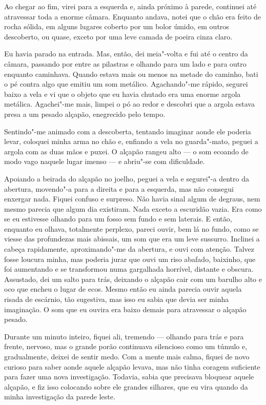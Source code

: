 Ao chegar ao fim, virei para a esquerda e, ainda próximo à parede, continuei até atravessar toda a enorme câmara.
Enquanto andava, notei que o chão era feito de rocha sólida, em alguns lugares coberto por um bolor úmido, em outros
descoberto, ou quase, exceto por uma leve camada de poeira cinza claro.

Eu havia parado na entrada. Mas, então, dei meia"-volta e fui até o centro da câmara, passando por entre as pilastras e
olhando para um lado e para outro enquanto caminhava. Quando estava mais ou menos na metade do caminho, bati o pé contra
algo que emitiu um som metálico. Agachando"-me rápido, segurei baixo a vela e vi que o objeto que eu havia chutado
era uma enorme argola metálica. Agachei"-me mais, limpei o pó ao redor e descobri que a argola estava presa a
um pesado alçapão, enegrecido pelo tempo.

Sentindo"-me animado com a descoberta, tentando imaginar aonde ele poderia levar, coloquei minha arma no chão e,
enfiando a vela no guarda"-mato, peguei a argola com as duas mãos e puxei. O alçapão rangeu alto --- o som ecoando de modo
vago naquele lugar imenso --- e abriu"-se com dificuldade.

Apoiando a beirada do alçapão no joelho, peguei a vela e segurei"-a dentro da abertura, movendo"-a para a direita e para
a esquerda, mas não consegui enxergar nada. Fiquei confuso e surpreso. Não havia sinal algum de degraus, nem mesmo
parecia que algum dia existiram. Nada exceto a escuridão vazia. Era como se eu estivesse olhando para um fosso sem
fundo e sem laterais. E então, enquanto eu olhava, totalmente perplexo, pareci ouvir, bem lá no fundo, como se viesse
das profundezas mais abissais, um som que era um leve sussurro. Inclinei a cabeça rapidamente, aproximando"-me da
abertura, e ouvi com atenção. Talvez fosse loucura minha, mas poderia jurar que ouvi um riso abafado, baixinho, que foi
aumentando e se transformou numa gargalhada horrível, distante e obscura. Assustado, dei um salto para trás, deixando o
alçapão cair com um barulho alto e oco que encheu o lugar de ecos. Mesmo então eu ainda parecia ouvir aquela risada de
escárnio, tão sugestiva, mas isso eu sabia que devia ser minha imaginação. O som que eu ouvira era baixo demais para
atravessar o alçapão pesado.

Durante um minuto inteiro, fiquei ali, tremendo --- olhando para trás e para frente, nervoso, mas o grande porão
continuava silencioso como um túmulo e, gradualmente, deixei de sentir medo. Com a mente mais calma, fiquei de novo
curioso para saber aonde aquele alçapão levava, mas não tinha coragem suficiente para fazer uma nova investigação.
Todavia, sabia que precisava bloquear aquele alçapão, e fiz isso colocando sobre ele grandes silhares, que eu vira
quando da minha investigação da parede leste. 

